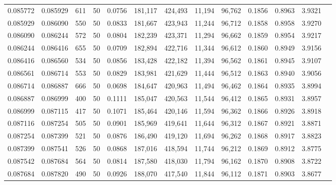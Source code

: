 \begin{tabular}{rrrrrrrrrrrrr}
0.085772 & 0.085929 &   611 &  50 &                                     0.0756 & 181,117 & 424,493 &  11,194 &  96,762 & 0.1856 & 0.8963 & 3.9321 \\
0.085929 & 0.086090 &   550 &  50 &                                     0.0833 & 181,667 & 423,943 &  11,244 &  96,712 & 0.1858 & 0.8958 & 3.9270 \\
0.086090 & 0.086244 &   572 &  50 &                                     0.0804 & 182,239 & 423,371 &  11,294 &  96,662 & 0.1859 & 0.8954 & 3.9217 \\
0.086244 & 0.086416 &   655 &  50 &                                     0.0709 & 182,894 & 422,716 &  11,344 &  96,612 & 0.1860 & 0.8949 & 3.9156 \\
0.086416 & 0.086560 &   534 &  50 &                                     0.0856 & 183,428 & 422,182 &  11,394 &  96,562 & 0.1861 & 0.8945 & 3.9107 \\
0.086561 & 0.086714 &   553 &  50 &                                     0.0829 & 183,981 & 421,629 &  11,444 &  96,512 & 0.1863 & 0.8940 & 3.9056 \\
0.086714 & 0.086887 &   666 &  50 &                                     0.0698 & 184,647 & 420,963 &  11,494 &  96,462 & 0.1864 & 0.8935 & 3.8994 \\
0.086887 & 0.086999 &   400 &  50 &                                     0.1111 & 185,047 & 420,563 &  11,544 &  96,412 & 0.1865 & 0.8931 & 3.8957 \\
0.086999 & 0.087115 &   417 &  50 &                                     0.1071 & 185,464 & 420,146 &  11,594 &  96,362 & 0.1866 & 0.8926 & 3.8918 \\
0.087116 & 0.087254 &   505 &  50 &                                     0.0901 & 185,969 & 419,641 &  11,644 &  96,312 & 0.1867 & 0.8921 & 3.8871 \\
0.087254 & 0.087399 &   521 &  50 &                                     0.0876 & 186,490 & 419,120 &  11,694 &  96,262 & 0.1868 & 0.8917 & 3.8823 \\
0.087399 & 0.087541 &   526 &  50 &                                     0.0868 & 187,016 & 418,594 &  11,744 &  96,212 & 0.1869 & 0.8912 & 3.8775 \\
0.087542 & 0.087684 &   564 &  50 &                                     0.0814 & 187,580 & 418,030 &  11,794 &  96,162 & 0.1870 & 0.8908 & 3.8722 \\
0.087684 & 0.087820 &   490 &  50 &                                     0.0926 & 188,070 & 417,540 &  11,844 &  96,112 & 0.1871 & 0.8903 & 3.8677 \\

\end{tabular}

